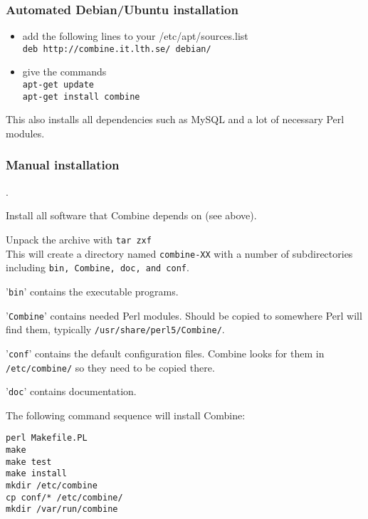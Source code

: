 \subsubsection{Automated Debian/Ubuntu installation}
\label{debian}
\begin{itemize}
\item add the following lines to your /etc/apt/sources.list\\
{\tt deb http://combine.it.lth.se/ debian/}
\item give the commands\\
{\tt apt-get update\\
apt-get install combine}
\end{itemize}
This also installs all dependencies such as MySQL and a lot of necessary
Perl modules.

\subsubsection{Manual installation}

.

Install all software that Combine depends on (see above).

Unpack the archive with {\tt  tar zxf }\\
This will create a directory named {\tt combine-XX} with
a number of subdirectories including {\tt bin, Combine, doc, and conf}.

'{\tt bin}' contains the executable programs.

'{\tt Combine}' contains needed Perl modules. Should be copied to
somewhere Perl will find them, typically {\tt /usr/share/perl5/Combine/}.

'{\tt conf}' contains the default configuration files. Combine looks for them
in {\tt /etc/combine/} so they need to be copied there.

'{\tt doc}' contains documentation.

The following command sequence will install Combine:
\begin{verbatim}
perl Makefile.PL
make
make test
make install
mkdir /etc/combine
cp conf/* /etc/combine/
mkdir /var/run/combine
\end{verbatim}


